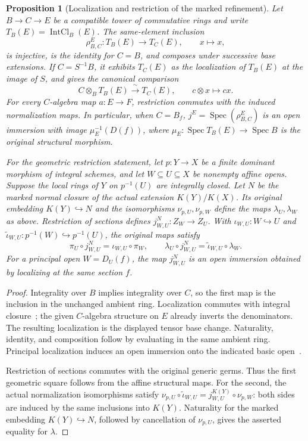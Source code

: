 \documentclass[11pt]{article}
\newtheorem{proposition}[theorem]{Proposition}
\theoremstyle{definition}
\theoremstyle{remark}
\DeclareMathOperator{\Spec}{Spec}
\begin{document}
\begin{proposition}[Localization and restriction of the marked refinement]
\label{prop:normalization-localization}
Let \(B\to C\to E\) be a compatible tower of commutative rings and
write \(T_B(E)=\operatorname{IntCl}_B(E)\).
The same-element inclusion
\[
  \rho_{B,C}^{E}:T_B(E)\longrightarrow T_C(E),\qquad x\longmapsto x,
\]
is injective, is the identity for \(C=B\), and composes under successive
base extensions. If \(C=S^{-1}B\), it exhibits \(T_C(E)\) as the
localization of \(T_B(E)\) at the image of \(S\), and gives the canonical
comparison
\[
  C\otimes_B T_B(E)\xrightarrow{\ \sim\ }T_C(E),\qquad
  c\otimes x\longmapsto cx.
\]
For every \(C\)-algebra map \(a:E\to F\), restriction commutes with
the induced normalization maps. In particular, when \(C=B_f\),
\(j^E=\Spec(\rho_{B,C}^{E})\) is an open immersion with image
\(\mu_E^{-1}(D(f))\), where \(\mu_E:\Spec T_B(E)\to\Spec B\)
is the original structural morphism.

For the geometric restriction statement, let \(p:Y\to X\) be a finite
dominant morphism of integral schemes, and let \(W\subseteq U\subseteq X\)
be nonempty affine opens. Suppose the local rings of \(Y\) on
\(p^{-1}(U)\) are integrally closed. Let \(N\) be the marked normal
closure of the actual extension \(K(Y)/K(X)\). Its original embedding
\(K(Y)\hookrightarrow N\) and the isomorphisms \(\nu_{p,U},\nu_{p,W}\)
define the maps \(\lambda_U,\lambda_W\) as above. Restriction of sections defines
\(j^N_{W,U}:Z_W\to Z_U\). With \(\iota_{W,U}:W\hookrightarrow U\)
and \(\widetilde\iota_{W,U}:p^{-1}(W)\hookrightarrow p^{-1}(U)\),
the original maps satisfy
\[
  \pi_U\circ j^N_{W,U}=\iota_{W,U}\circ\pi_W,
  \qquad
  \lambda_U\circ j^N_{W,U}
    =\widetilde\iota_{W,U}\circ\lambda_W.
\]
For a principal open \(W=D_U(f)\), the map \(j^N_{W,U}\) is an
open immersion obtained by localizing at the same section \(f\).
\end{proposition}

\begin{proof}
Integrality over \(B\) implies integrality over \(C\), so the first
map is the inclusion in the unchanged ambient ring. Localization
commutes with integral closure~\cite{StacksIntegralClosureLocalization};
the given \(C\)-algebra structure on \(E\) already inverts the
denominators. The resulting localization is the displayed tensor base
change. Naturality, identity, and composition follow by evaluating in
the same ambient ring. Principal localization induces an open immersion
onto the indicated basic open~\cite{StacksPrincipalLocalizationOpen}.

Restriction of sections commutes with the original generic germs.
Thus the first geometric square follows from the affine structural
maps. For the second, the actual normalization isomorphisms satisfy
\(\nu_{p,U}\circ\widetilde\iota_{W,U}
=j^{K(Y)}_{W,U}\circ\nu_{p,W}\): both sides are induced by the same
inclusions into \(K(Y)\). Naturality for the marked embedding
\(K(Y)\hookrightarrow N\), followed by cancellation of \(\nu_{p,U}\),
gives the asserted equality for \(\lambda\).
\end{proof}
\end{document}
